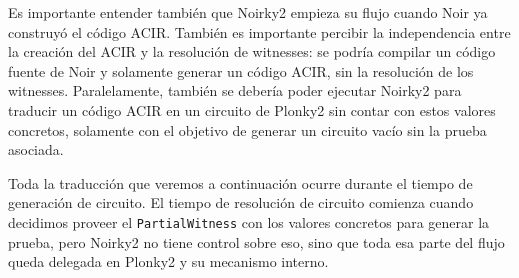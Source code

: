 Es importante entender también que Noirky2 empieza su flujo cuando Noir ya construyó el código ACIR. También es importante percibir la independencia entre la creación del ACIR y la resolución de witnesses: se podría compilar un código fuente de Noir y solamente generar un código ACIR, sin la resolución de los witnesses. Paralelamente, también se debería poder ejecutar Noirky2 para traducir un código ACIR en un circuito de Plonky2 sin contar con estos valores concretos, solamente con el objetivo de generar un circuito vacío sin la prueba asociada. 

Toda la traducción que veremos a continuación ocurre durante el tiempo de generación de circuito. El tiempo de resolución de circuito comienza cuando decidimos proveer el \texttt{PartialWitness} con los valores concretos para generar la prueba, pero Noirky2 no tiene control sobre eso, sino que toda esa parte del flujo queda delegada en Plonky2 y su mecanismo interno.

